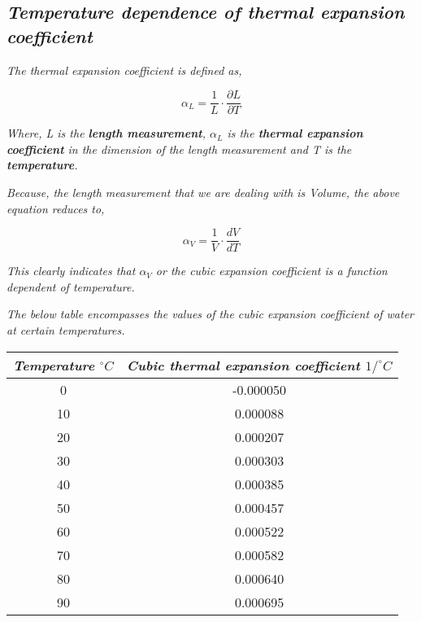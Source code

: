 
\subsection{\textit{Temperature dependence of thermal expansion \\ coefficient}}

	\textit{The thermal expansion coefficient is defined as,}
	
		$$\alpha_{L} = \frac{1}{L}\cdot\frac{\partial L}{\partial T}$$
	
	\textit{Where, L is the \textbf{length measurement}, $\alpha_{L}$ is the \textbf{thermal expansion coefficient} in the dimension of the length measurement and T is the \textbf{temperature}.}	
	
	\textit{Because, the length measurement that we are dealing with is Volume, the above equation reduces to,}

		$$\alpha_{V} = \frac{1}{V}\cdot\frac{dV}{dT}$$
	
	\textit{This clearly indicates that $\alpha_{V}$ or the cubic expansion coefficient is a function dependent of temperature.}	
	
	\textit{The below table encompasses the values of the cubic expansion coefficient of water at certain temperatures.}	
	
	\begin{table}[H]
		\centering
		\begin{tabular}{|c|c|}
		\hline
		\hline
		\textit{Temperature $^\circ C$} & \textit{Cubic thermal expansion coefficient $1/^\circ C$} \\
		\hline
		\hline
		0 & -0.000050 \\
		\hline		
		10 & 0.000088 \\
		\hline
		20 & 0.000207 \\
		\hline
		30 & 0.000303 \\
		\hline
		40 & 0.000385 \\
		\hline
		50 & 0.000457 \\
		\hline
		60 & 0.000522 \\
		\hline
		70 & 0.000582 \\
		\hline
		80 & 0.000640 \\
		\hline
		90 & 0.000695 \\
		\hline
		\hline 
		\end{tabular}
	
	\end{table}

